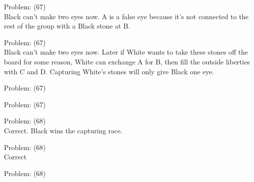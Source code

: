 \documentclass[11pt]{article}
\begin{document}
\begin{minipage}[t]{0.5\textwidth}
  {\centering
  
  Problem: (67)\\
  Black can't make two eyes now. A is a false eye because it's not connected to the rest of the group with a Black stone at B.\\
  }
\end{minipage}
\begin{minipage}[t]{0.5\textwidth}
  {\centering
  
  Problem: (67)\\
  Black can't make two eyes now. Later if White wants to take these stones off the board for some reason, White can exchange A for B, then fill the outside liberties with C and D. Capturing White's stones will only give Black one eye.\\
  }
\end{minipage}
\begin{minipage}[t]{0.5\textwidth}
  {\centering
  
  Problem: (67)\\
  
  }
\end{minipage}
\begin{minipage}[t]{0.5\textwidth}
  {\centering
  
  Problem: (67)\\
  
  }
\end{minipage}
\begin{minipage}[t]{0.5\textwidth}
  {\centering
  
  Problem: (68)\\
  Correct. Black wins the capturing race.\\
  }
\end{minipage}
\begin{minipage}[t]{0.5\textwidth}
  {\centering
  
  Problem: (68)\\
  Correct\\
  }
\end{minipage}
\begin{minipage}[t]{0.5\textwidth}
  {\centering
  
  Problem: (68)\\
  
  }
\end{minipage}
\end{document}
